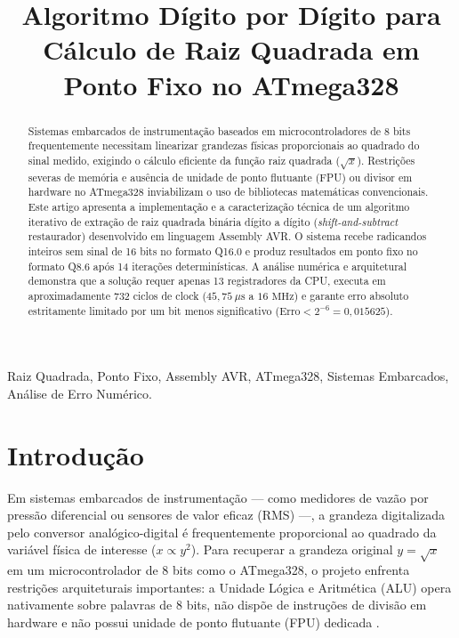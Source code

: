 \documentclass[conference]{IEEEtran}
\begin{document}
\title{Algoritmo Dígito por Dígito para Cálculo de Raiz Quadrada em Ponto Fixo no ATmega328}

\author{
}

\maketitle

\begin{abstract}
	Sistemas embarcados de instrumentação baseados em microcontroladores de 8 bits frequentemente necessitam linearizar grandezas físicas proporcionais ao quadrado do sinal medido, exigindo o cálculo eficiente da função raiz quadrada ($\sqrt{x}$). Restrições severas de memória e ausência de unidade de ponto flutuante (FPU) ou divisor em hardware no ATmega328 inviabilizam o uso de bibliotecas matemáticas convencionais. Este artigo apresenta a implementação e a caracterização técnica de um algoritmo iterativo de extração de raiz quadrada binária dígito a dígito (\textit{shift-and-subtract} restaurador) desenvolvido em linguagem Assembly AVR. O sistema recebe radicandos inteiros sem sinal de 16 bits no formato Q16.0 e produz resultados em ponto fixo no formato Q8.6 após 14 iterações determinísticas. A análise numérica e arquitetural demonstra que a solução requer apenas 13 registradores da CPU, executa em aproximadamente 732 ciclos de clock ($45{,}75\ \mu\text{s}$ a $16\text{ MHz}$) e garante erro absoluto estritamente limitado por um bit menos significativo ($\text{Erro} < 2^{-6} = 0{,}015625$).
\end{abstract}

\begin{IEEEkeywords}
	Raiz Quadrada, Ponto Fixo, Assembly AVR, ATmega328, Sistemas Embarcados, Análise de Erro Numérico.
\end{IEEEkeywords}

\section{Introdução}
Em sistemas embarcados de instrumentação — como medidores de vazão por pressão diferencial ou sensores de valor eficaz (RMS) —, a grandeza digitalizada pelo conversor analógico-digital é frequentemente proporcional ao quadrado da variável física de interesse ($x \propto y^2$). Para recuperar a grandeza original $y = \sqrt{x}$ em um microcontrolador de 8 bits como o ATmega328, o projeto enfrenta restrições arquiteturais importantes: a Unidade Lógica e Aritmética (ALU) opera nativamente sobre palavras de 8 bits, não dispõe de instruções de divisão em hardware e não possui unidade de ponto flutuante (FPU) dedicada \cite{ref1}.
\end{document}
